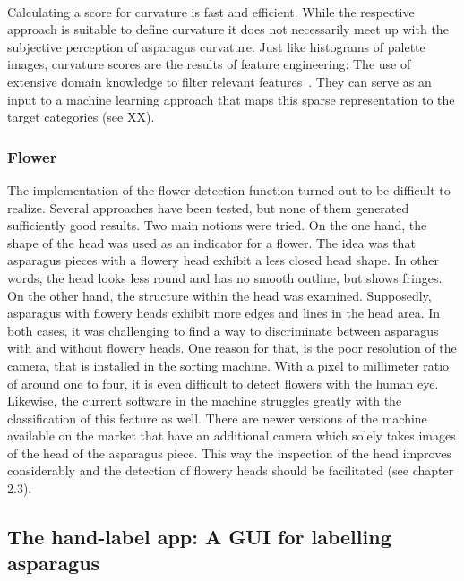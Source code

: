 \\
Calculating a score for curvature is fast and efficient. While the respective approach is suitable to define curvature it does not necessarily meet up with the subjective perception of asparagus curvature. Just like histograms of palette images, curvature scores are the results of feature engineering: The use of extensive domain knowledge to filter relevant features~\citep{zheng2018feature}. They can serve as an input to a machine learning approach that maps this sparse representation to the target categories  (see XX).


\subsubsection{Flower}
\label{subsec:Flower}

The implementation of the flower detection function turned out to be difficult to realize. Several approaches have been tested, but none of them generated sufficiently good results. Two main notions were tried. On the one hand, the shape of the head was used as an indicator for a flower. The idea was that asparagus pieces with a flowery head exhibit a less closed head shape. In other words, the head looks less round and has no smooth outline, but shows fringes. On the other hand, the structure within the head was examined. Supposedly, asparagus with flowery heads exhibit more edges and lines in the head area. In both cases, it was challenging to find a way to discriminate between asparagus with and without flowery heads. One reason for that, is the poor resolution of the camera, that is installed in the sorting machine. With a pixel to millimeter ratio of around one to four, it is even difficult to detect flowers with the human eye. Likewise, the current software in the machine struggles greatly with the classification of this feature as well. There are newer versions of the machine available on the market that have an additional camera which solely takes images of the head of the asparagus piece. This way the inspection of the head improves considerably and the detection of flowery heads should be facilitated (see chapter 2.3).


\subsection{The hand-label app: A GUI for labelling asparagus}
\label{sec:LabelApp}

